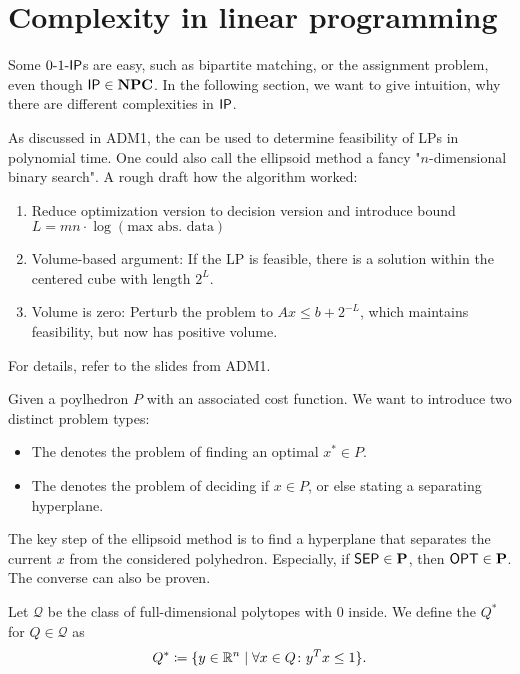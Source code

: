 \section{Complexity in linear programming}
Some $\text{0-1-}\mathsf{IP}$s are easy, such as bipartite matching, or the assignment problem, even though $\mathsf{IP} \in \mathbf{NPC}$.
In the following section, we want to give intuition, why there are different complexities in $\mathsf{IP}$.
\begin{recall}
    As discussed in ADM1, the  can be used to determine feasibility of LPs in polynomial time.
    One could also call the ellipsoid method a fancy "$n$-dimensional binary search".
    A rough draft how the algorithm worked:
    \begin{enumerate}
        \item Reduce optimization version to decision version and introduce bound $L = mn \cdot \log(\text{max abs. data})$
        \item Volume-based argument: If the LP is feasible, there is a solution within the centered cube with length $2^L$.
        \item Volume is zero: Perturb the problem to $Ax \leq b + 2^{-L}$, which maintains feasibility, but now has positive volume.
    \end{enumerate}
    For details, refer to the slides from ADM1.
\end{recall}
\begin{definition}
    Given a poylhedron $P$ with an associated cost function. We want to introduce two distinct problem types:
    \begin{itemize}
        \item The  denotes the problem of finding an optimal $x^* \in P$.
        \item The  denotes the problem of deciding if $x \in P$, or else stating a separating hyperplane.
    \end{itemize}
\end{definition}
\begin{remark}
    The key step of the ellipsoid method is to find a hyperplane that separates the current $x$ from the considered polyhedron.
    Especially, if $\mathsf{SEP} \in \mathbf{P}$, then $\mathsf{OPT} \in \mathbf{P}$. The converse can also be proven.
\end{remark}
\begin{definition}
    Let $\mathcal{Q}$ be the class of full-dimensional polytopes with $0$ inside.
    We define the  $Q^*$ for $Q \in \mathcal{Q}$ as
    \begin{align*}
        Q^* \coloneqq \{ y \in \mathbb{R}^n \mid \forall x \in Q \colon y^Tx \leq 1  \}.
    \end{align*}
\end{definition}
